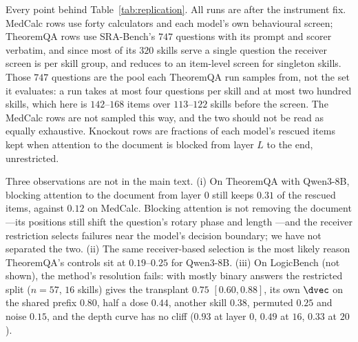 Every point behind Table~\ref{tab:replication}. All runs are after the
instrument fix. MedCalc rows use forty calculators and each model's own
behavioural screen; TheoremQA rows use SRA-Bench's $747$ questions with its
prompt and scorer verbatim, and since most of its $320$ skills serve a single
question the receiver screen is per skill group, and reduces to an item-level screen for singleton skills.
Those $747$ questions are the pool each TheoremQA run samples from, not the set
it evaluates: a run takes at most four questions per skill and at most two
hundred skills, which here is $142$--$168$ items over $113$--$122$ skills before
the screen. The MedCalc rows are not sampled this way, and the two should not be
read as equally exhaustive. Knockout rows are fractions of each
model's rescued items kept when attention to the document is blocked from layer
$L$ to the end, unrestricted.

\begin{table}[tbp]
\caption{The replication curves. Battery, sufficiency and rank are $\rho$
(Eq.~\ref{eq:rho}) on the restricted split; necessity is the fraction of rescued
items kept. ``Another family'' (MedCalc) and ``another skill'' (TheoremQA) are
the transfer controls available in each set.}
\label{tab:replicationfull}
\centering
\scriptsize
\setlength{\tabcolsep}{3pt}

\end{table}

Three observations are not in the main text. (i) On TheoremQA with Qwen3-8B,
blocking attention to the document from layer $0$ still keeps $0.31$ of the
rescued items, against $0.12$ on MedCalc. Blocking attention is not removing
the document---its positions still shift the question's rotary phase and length
---and the receiver restriction selects failures near the model's decision
boundary; we have not separated the two. (ii) The same receiver-based selection is the
most likely reason TheoremQA's controls sit at $0.19$--$0.25$ for Qwen3-8B. (iii)
On LogicBench (not shown), the method's resolution fails: with mostly binary
answers the restricted split ($n=57$, $16$ skills) gives the transplant $0.75$
$[0.60, 0.88]$, its own $\dvec$ on the shared prefix $0.80$, half a dose $0.44$, another skill
$0.38$, permuted $0.25$ and noise $0.15$, and the depth curve has no cliff
($0.93$ at layer $0$, $0.49$ at $16$, $0.33$ at $20$).
